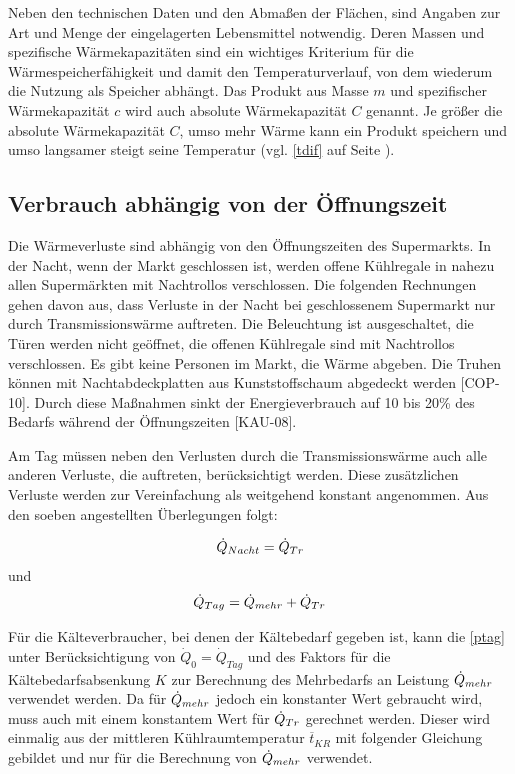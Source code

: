 Neben den technischen Daten und den Abmaßen der Flächen, sind Angaben zur Art und Menge der eingelagerten Lebensmittel
notwendig. Deren Massen und spezifische Wärmekapazitäten sind ein wichtiges Kriterium für die Wärmespeicherfähigkeit und
damit den Temperaturverlauf, von dem wiederum die Nutzung als Speicher abhängt. Das Produkt aus Masse $m$ und spezifischer
Wärmekapazität $c$ wird auch absolute Wärmekapazität $C$ genannt. Je größer die absolute Wärmekapazität $C$, umso mehr Wärme
kann ein Produkt speichern und umso langsamer steigt seine Temperatur (vgl. \cref{tdif} auf Seite ).

\subsection{Verbrauch abhängig von der Öffnungszeit}

Die Wärmeverluste sind abhängig von den Öffnungszeiten des Supermarkts. In der Nacht, wenn der Markt geschlossen ist, werden
offene Kühlregale in nahezu allen Supermärkten mit Nachtrollos verschlossen. Die folgenden Rechnungen gehen davon aus, dass
Verluste in der Nacht bei geschlossenem Supermarkt nur durch Transmissionswärme auftreten. Die Beleuchtung ist ausgeschaltet,
die Türen werden nicht geöffnet, die offenen Kühlregale sind mit Nachtrollos verschlossen. Es gibt keine Personen im Markt, die
Wärme abgeben. Die Truhen können mit Nachtabdeckplatten aus Kunststoffschaum abgedeckt werden [COP-10]. Durch diese Maßnahmen
sinkt der Energieverbrauch auf 10 bis 20\% des Bedarfs während der Öffnungszeiten [KAU-08].

Am Tag müssen neben den Verlusten durch die Transmissionswärme auch alle anderen Verluste, die auftreten, berücksichtigt
werden. Diese zusätzlichen Verluste werden zur Vereinfachung als weitgehend konstant angenommen.
Aus den soeben angestellten Überlegungen folgt:

\begin{equation}
	\dot{Q}_{Nacht}=\ptrans
\label{pnacht}
\end{equation}
und
\begin{equation}
	\dot{Q}_{Tag} = \pmehr + \ptrans
\label{ptag}
\end{equation}

Für die Kälteverbraucher, bei denen der Kältebedarf gegeben ist, kann die \cref{ptag} unter Berücksichtigung von
$\dot{Q}_0 = \dot{Q}_{Tag}$  und des Faktors für die Kältebedarfsabsenkung $K$ zur Berechnung des Mehrbedarfs an Leistung
$\dot{Q}_{mehr}$ verwendet werden. Da für $\dot{Q}_{mehr}$ jedoch ein konstanter Wert gebraucht wird, muss auch mit einem konstantem Wert für
$\dot{Q}_{Tr}$ gerechnet werden. Dieser wird einmalig aus der mittleren Kühlraumtemperatur $\overline{t}_{KR}$ mit folgender Gleichung
gebildet und nur für die Berechnung von $\dot{Q}_{mehr}$ verwendet.

